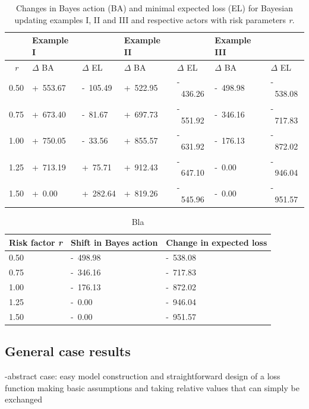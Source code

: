 				\begin{table}
					\centering
					\begin{tabular}[c]{| c || l | l || l | l || l | l |}
						\hline
						& Example I & & Example II & & Example III & \\
						\hline
						\hline
						\textit{r} & $\Delta$ BA & $\Delta$ EL & $\Delta$ BA & $\Delta$ EL & $\Delta$ BA & $\Delta$ EL\\ 
						\hline
						0.50 & +~553.67 & -~105.49 & +~522.95 & -~436.26 & -~498.98 & -~538.08 \\ 
						0.75 & +~673.40 & -~81.67 & +~697.73 & -~551.92 & -~346.16 & -~717.83  \\ 
						1.00 & +~750.05 & -~33.56 & +~855.57 & -~631.92 & -~176.13 & -~872.02 \\ 
						1.25 & +~713.19 & +~75.71 & +~912.43 & -~647.10 & -~0.00 & -~946.04 \\ 
						1.50 & +~0.00 & +~282.64 & +~819.26 & -~545.96 & -~0.00 & -~951.57  \\ 
						\hline
					\end{tabular}
					\caption{Changes in Bayes action (BA) and minimal expected loss (EL) for Bayesian updating examples I, II and III and respective actors with risk parameters \textit{r}.}
					\label{tab:update_examples_all}
				\end{table}
				
				\begin{table}
						\centering
						\begin{tabular}[c]{| l | l | l |}
							\hline
							Risk factor \textit{r} & Shift in Bayes action & Change in expected loss \\ \hline
							0.50 & -~498.98 & -~538.08 \\ 
							0.75 & -~346.16 & -~717.83  \\ 
							1.00 & -~176.13 & -~872.02 \\ 
							1.25 & -~0.00 & -~946.04 \\ 
							1.50 & -~0.00 & -~951.57  \\ 
							\hline
						\end{tabular}
						\caption{Bla}
						\label{tab:update_examples_all}
				\end{table}
			\subsection{General case results}
		
			-abstract case: easy model construction and straightforward design of a loss function making basic assumptions and taking relative values that can simply be exchanged
		
